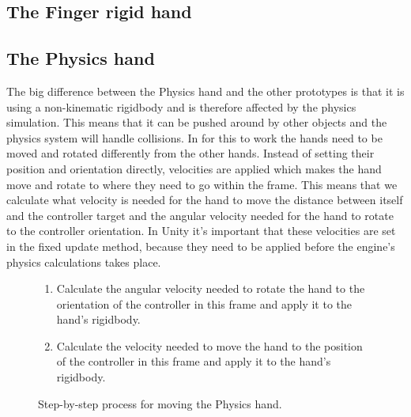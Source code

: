 

\subsection{The Finger rigid hand}
\label{subsec:slidingRigidHand}

\subsection{The Physics hand}
\label{subsec:slidingRigidHand}
The big difference between the Physics hand and the other prototypes is that it is using a non-kinematic rigidbody and is therefore affected by the physics simulation. This means that it can be pushed around by other objects and the physics system will handle collisions. In for this to work the hands need to be moved and rotated differently from the other hands. Instead of setting their position and orientation directly, velocities are applied which makes the hand move and rotate to where they need to go within the frame. This means that we calculate what velocity is needed for the hand to move the distance between itself and the controller target and the angular velocity needed for the hand to rotate to the controller orientation. In Unity it's important that these velocities are set in the fixed update method, because they need to be applied before the engine's physics calculations takes place.

\begin{figure}[H]
\centering
\small
\begin{enumerate}[noitemsep]
\item Calculate the angular velocity needed to rotate the hand to the orientation of the controller in this frame and apply it to the hand's rigidbody.
\item Calculate the velocity needed to move the hand to the position of the controller in this frame and apply it to the hand's rigidbody.
\end{enumerate}
\caption{Step-by-step process for moving the Physics hand.}
\label{fig:stepByStepRigidHand}
\end{figure}

